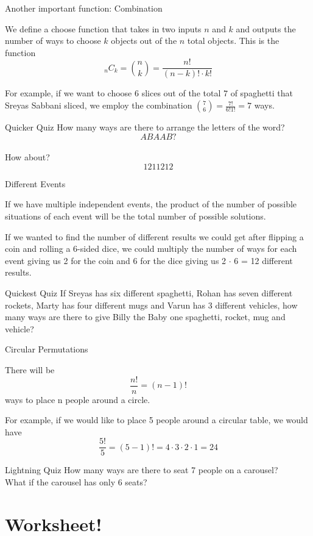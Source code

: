 \documentclass[aspectratio=169,xcolor=dvipsnames]{beamer}
\begin{document}
\begin{frame}[t]{Another important function: Combination}
    \begin{definition}
        We define a choose function that takes in two inputs $n$ and $k$ and outputs the number of ways to choose $k$ objects out of the $n$ total objects. This is the function
        \[
        _nC_k=\binom nk=\frac{n!}{(n-k)!\cdot k!}
        \]
    \end{definition}
    
    \vspace{2cm}
    
    For example, if we want to choose $6$ slices out of the total $7$ of spaghetti that Sreyas Sabbani sliced, we employ the combination $\binom 76=\frac{7!}{6!1!}=7$ ways.
\end{frame}

\begin{frame}[t]{Quicker Quiz}
    How many ways are there to arrange the letters of the word?
    \[ABAAB?\]\\
    \vspace{1.5cm}
    How about?
    \[1211212\]
\end{frame}
\begin{frame}[t]{Different Events}
    \begin{definition}
        If we have multiple independent events, the product of the number of possible situations of each event will be the total number of possible solutions.
    \end{definition}
    \vspace{3cm}
    If we wanted to find the number of different results we could get after flipping a coin and rolling a 6-sided dice, we could multiply the number of ways for each event giving us 2 for the coin and 6 for the dice giving us 2 $\cdot$ 6 = 12 different results.
\end{frame}
\begin{frame}[t]{Quickest Quiz}
    If Sreyas has six different spaghetti, Rohan has seven different rockets, Marty has four different mugs and Varun has 3 different vehicles, how many ways are there to give Billy the Baby one spaghetti, rocket, mug and vehicle?
\end{frame}
\begin{frame}[t]{Circular Permutations}
    \begin{definition}
        There will be \[
        \frac{n!}{n} = (n-1)!
        \]
        ways to place n people around a circle.
        
    \end{definition}
    \vspace{2.5cm}
    For example, if we would like to place 5 people around a circular table, we would have \[\frac{5!}{5} = (5-1)! = 4 \cdot 3 \cdot 2 \cdot 1 = 24\]

\end{frame}
\begin{frame}[t]{Lightning Quiz}
    How many ways are there to seat 7 people on a carousel? \\
    \vspace{2.5cm}
    What if the carousel has only 6 seats?
\end{frame}
\section{Worksheet!}
\end{document}
